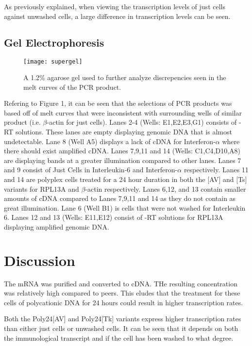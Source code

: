 \documentclass[journal, a4paper]{IEEEtran}
\begin{document}
    As previously explained, when viewing the transcription levels of just cells
    against unwashed cells, a large difference in transcription levels can be seen.

  \subsection{Gel Electrophoresis}

    \begin{figure}[t]
      \centering
      \texttt{[image: supergel]}
      \caption{A 1.2\% agarose gel used to further analyze discrepencies seen in the melt curves of the PCR product.}
      \label{fig:mesh1}
    \end{figure}

    Refering to Figure 1, it can be seen that the selections of PCR products was based off of melt curves that were inconsistent with
    surrounding wells of similar product (i.e. $\beta$-actin for just cells).
    Lanes 2-4 (Wells: E1,E2,E3,G1) consists of -RT solutions. These lanes are empty displaying
    genomic DNA that is almost undetectable. Lane 8 (Well A5) displays a lack of cDNA
    for Interferon-$\alpha$ where there should exist amplified cDNA. Lanes  7,9,11 and 14
    (Wells: C1,C4,D10,A8) are displaying bands at a greater illumination compared to other lanes.
    Lanes 7 and 9 consist of Just Cells in Interleukin-6 and Interferon-$\alpha$ respectively.
    Lanes 11 and 14 are polyplex cells treated for a 24 hour duration in both the [AV] and [Ts] variants
    for RPL13A and $\beta$-actin respectively.
    Lanes 6,12, and 13 contain smaller amounts of cDNA compared to Lanes 7,9,11 and 14 as they do not contain
    as great illumination.
    Lane 6 (Well B1) is cells that were not washed for Interleukin 6.
    Lanes 12 and 13 (Wells: E11,E12) consist of -RT solutions for RPL13A displaying amplified genomic DNA.

\section{Discussion}

The mRNA was purified and converted to cDNA. THe resulting concentration was relatively high compared to peers. This eludes that the
treatment for these cells of polycationic DNA for 24 hours could result in higher transcription rates.


Both the Poly24[AV] and Poly24[Tk] variants express higher transcription rates
than either just cells or unwashed cells. It can be seen that it depends on both
the immunological transcript and if the cell has been washed to what degree.
\end{document}
